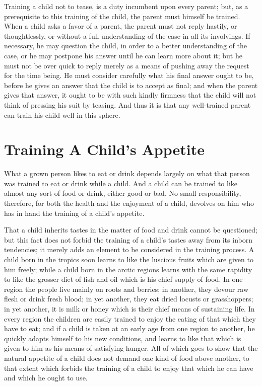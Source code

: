 \documentclass[
]{book}
\begin{document}
Training a child not to tease, is a duty incumbent upon every parent; but, as a prerequisite to this training of the child, the parent must himself be trained. When a child asks a favor of a parent, the parent must not reply hastily, or thoughtlessly, or without a full understanding of the case in all its involvings. If necessary, he may question the child, in order to a better understanding of the case, or he may postpone his answer until he can learn more about it; but he must not be over quick to reply merely as a means of pushing away the request for the time being. He must consider carefully what his final answer ought to be, before he gives an answer that the child is to accept as final; and when the parent gives that answer, it ought to be with such kindly firmness that the child will not think of pressing his suit by teasing. And thus it is that any well-trained parent can train his child well in this sphere.

\hypertarget{training-a-childs-appetite}{%
\chapter{Training A Child's Appetite}\label{training-a-childs-appetite}}

What a grown person likes to eat or drink depends largely on what that person was trained to eat or drink while a child. And a child can be trained to like almost any sort of food or drink, either good or bad. No small responsibility, therefore, for both the health and the enjoyment of a child, devolves on him who has in hand the training of a child's appetite.

That a child inherits tastes in the matter of food and drink cannot be questioned; but this fact does not forbid the training of a child's tastes away from its inborn tendencies; it merely adds an element to be considered in the training process. A child born in the tropics soon learns to like the luscious fruits which are given to him freely; while a child born in the arctic regions learns with the same rapidity to like the grosser diet of fish and oil which is his chief supply of food. In one region the people live mainly on roots and berries; in another, they devour raw flesh or drink fresh blood; in yet another, they eat dried locusts or grasshoppers; in yet another, it is milk or honey which is their chief means of sustaining life. In every region the children are easily trained to enjoy the eating of that which they have to eat; and if a child is taken at an early age from one region to another, he quickly adapts himself to his new conditions, and learns to like that which is given to him as his means of satisfying hunger. All of which goes to show that the natural appetite of a child does not demand one kind of food above another, to that extent which forbids the training of a child to enjoy that which he can have and which he ought to use.
\end{document}
